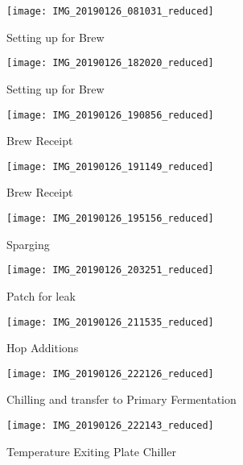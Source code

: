 \begin{figure}[H]
  \centering
  \texttt{[image: IMG\_20190126\_081031\_reduced]}
  \caption{Setting up for Brew}\label{fig:brew:setup2}
\end{figure}

\begin{figure}[H]
  \centering
  \texttt{[image: IMG\_20190126\_182020\_reduced]}
  \caption{Setting up for Brew}\label{fig:brew:setup3}
\end{figure}

\begin{figure}[H]
  \centering
  \texttt{[image: IMG\_20190126\_190856\_reduced]}
  \caption{Brew Receipt}\label{fig:brew:receipt}
\end{figure}

\begin{figure}[H]
  \centering
  \texttt{[image: IMG\_20190126\_191149\_reduced]}
  \caption{Brew Receipt}\label{fig:brew:receipt}
\end{figure}

\begin{figure}[H]
  \centering
  \texttt{[image: IMG\_20190126\_195156\_reduced]}
  \caption{Sparging}\label{fig:brew:sparge}
\end{figure}

\begin{figure}[H]
  \centering
  \texttt{[image: IMG\_20190126\_203251\_reduced]}
  \caption{Patch for leak}\label{fig:brew:leak}
\end{figure}

\begin{figure}[H]
  \centering
  \texttt{[image: IMG\_20190126\_211535\_reduced]}
  \caption{Hop Additions}\label{fig:brew:hopadditions}
\end{figure}

\begin{figure}[H]
  \centering
  \texttt{[image: IMG\_20190126\_222126\_reduced]}
  \caption{Chilling and transfer to Primary Fermentation}\label{fig:brew:chilling}
\end{figure}

\begin{figure}[H]
  \centering
  \texttt{[image: IMG\_20190126\_222143\_reduced]}
  \caption{Temperature Exiting Plate Chiller}\label{fig:brew:chilltemp}
\end{figure}

